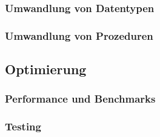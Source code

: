 		\subsubsection{Umwandlung von Datentypen}
		\subsubsection{Umwandlung von Prozeduren}
	\subsection{Optimierung}
		\subsubsection{Performance und Benchmarks}
		\subsubsection{Testing}
